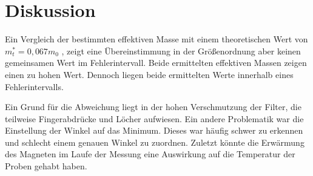 \section{Diskussion}
\label{sec:Diskussion}

\raggedright

Ein Vergleich der bestimmten effektiven Masse mit einem theoretischen Wert von $m^*_t=0,067m_0$ \cite{theo}, zeigt eine Übereinstimmung in der
Größenordnung aber keinen gemeinsamen Wert im Fehlerintervall. Beide ermittelten effektiven Massen zeigen einen zu hohen Wert.
Dennoch liegen beide ermittelten Werte innerhalb eines Fehlerintervalls.
\medskip

Ein Grund für die Abweichung liegt in der hohen Verschmutzung der Filter, die teilweise Fingerabdrücke und Löcher aufwiesen.
Ein andere Problematik war die Einstellung der Winkel auf das Minimum. Dieses war häufig schwer zu erkennen und schlecht einem genauen Winkel zu zuordnen.
Zuletzt könnte die Erwärmung des Magneten im Laufe der Messung eine Auswirkung auf die Temperatur der Proben gehabt haben.